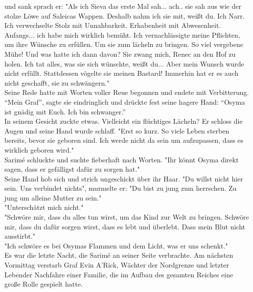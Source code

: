 und sank sprach er: "Als ich Sieva das erste Mal sah... ach.. sie sah aus wie der stolze Löwe auf 
Saleicas Wappen. Deshalb nahm ich sie mit, weißt du. Ich Narr. Ich verwechselte Stolz mit 
Unnahbarkeit. Erhabenheit mit Abwesenheit. Anfangs... ich habe mich wirklich bemüht. Ich 
vernachlässigte meine Pflichten, um ihre Wünsche zu erfüllen. Um sie zum lächeln zu bringen. So 
viel vergebene Mühe! Und was hatte ich dann davon? Sie zwang mich, Renec an den Hof zu holen. Ich 
tat alles, was sie sich wünschte, weißt du... Aber mein Wunsch wurde nicht erfüllt. Stattdessen 
vögelte sie meinen Bastard! Immerhin hat er es auch nicht geschafft, sie zu schwängern."\\
Seine Rede hatte mit Worten voller Reue begonnen und endete mit Verbitterung.\\
``Mein Graf'', sagte sie eindringlich und drückte fest seine hagere Hand: ``Osyma ist gnädig mit 
Euch. Ich bin schwanger.''\\
In seinem Gesicht zuckte etwas. Vielleicht ein flüchtiges Lächeln? Er schloss die Augen und seine 
Hand wurde schlaff. "Erst so kurz. So viele Leben sterben bereits, bevor sie geboren sind. Ich 
werde nicht da sein um aufzupassen, dass es wirklich geboren wird."\\
Sarimé schluckte und suchte fieberhaft nach Worten. "Ihr könnt Osyma direkt sagen, dass er 
gefälligst dafür zu sorgen hat."\\
Seine Hand hob sich und strich ungeschickt über ihr Haar. "Du willst nicht hier sein. Uns verbindet 
nichts", murmelte er: "Du bist zu jung zum herrschen. Zu jung um alleine Mutter zu sein."\\
"Unterschätzt mich nicht."\\
"Schwöre mir, dass du alles tun wirst, um das Kind zur Welt zu bringen. Schwöre mir, dass du dafür 
sorgen wirst, dass es lebt und überlebt. Dass mein Blut nicht ausstirbt."\\
"Ich schwöre es bei Osymas Flammen und dem Licht, was er uns schenkt."\\
Es war die letzte Nacht, die Sarimé an seiner Seite verbrachte. Am nächsten Vormittag verstarb Graf 
Evin A’Rick, Wächter der Nordgrenze und letzter Lebender Nachfahre einer Familie, die im Aufbau des 
gesamten Reiches eine große Rolle gespielt hatte.\\



